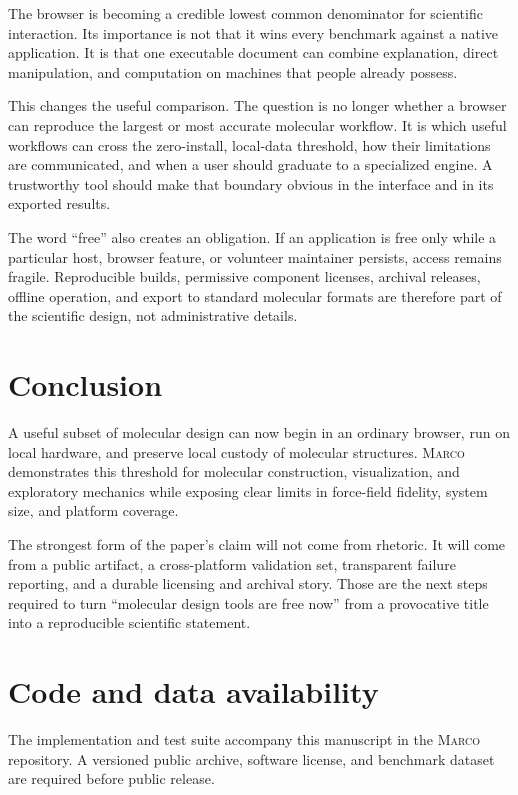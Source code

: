 \documentclass[11pt]{article}
\newcommand{\marco}{\textsc{Marco}}
\begin{document}
The browser is becoming a credible lowest common denominator for scientific
interaction.
Its importance is not that it wins every benchmark against a native application.
It is that one executable document can combine explanation, direct manipulation,
and computation on machines that people already possess.

This changes the useful comparison.
The question is no longer whether a browser can reproduce the largest or most
accurate molecular workflow.
It is which useful workflows can cross the zero-install, local-data threshold,
how their limitations are communicated, and when a user should graduate to a
specialized engine.
A trustworthy tool should make that boundary obvious in the interface and in its
exported results.

The word ``free'' also creates an obligation.
If an application is free only while a particular host, browser feature, or
volunteer maintainer persists, access remains fragile.
Reproducible builds, permissive component licenses, archival releases, offline
operation, and export to standard molecular formats are therefore part of the
scientific design, not administrative details.

\section{Conclusion}
\label{sec:conclusion}

A useful subset of molecular design can now begin in an ordinary browser, run on
local hardware, and preserve local custody of molecular structures.
\marco{} demonstrates this threshold for molecular construction, visualization,
and exploratory mechanics while exposing clear limits in force-field fidelity,
system size, and platform coverage.

The strongest form of the paper's claim will not come from rhetoric.
It will come from a public artifact, a cross-platform validation set, transparent
failure reporting, and a durable licensing and archival story.
Those are the next steps required to turn ``molecular design tools are free now''
from a provocative title into a reproducible scientific statement.

\section*{Code and data availability}

The implementation and test suite accompany this manuscript in the \marco{}
repository.
A versioned public archive, software license, and benchmark dataset are required
before public release.
\end{document}
